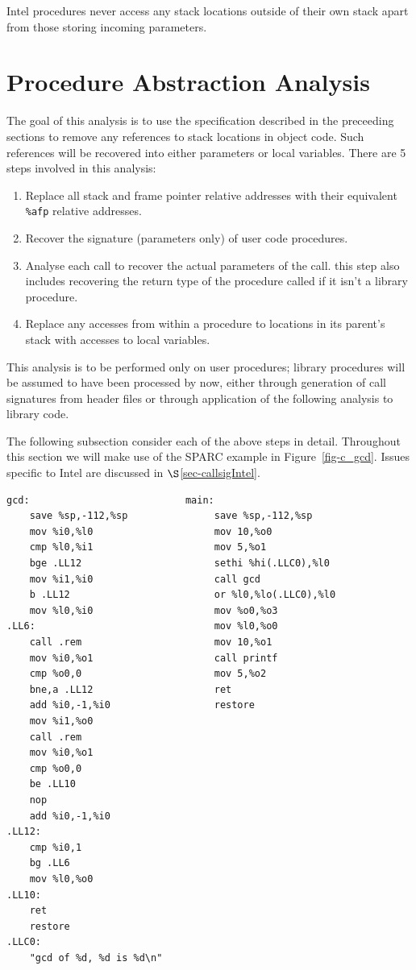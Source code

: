 Intel procedures never access any stack locations outside of their
own stack apart from those storing incoming parameters.

\section{Procedure Abstraction Analysis}

The goal of this analysis is to use the specification described in the
preceeding sections to remove any references to stack locations in
object code. Such references will be recovered into either parameters
or local variables. There are 5 steps involved in this analysis:

\begin{enumerate}
\item Replace all stack and frame pointer relative addresses with
  their equivalent {\tt \%afp} relative addresses.
\item Recover the signature (parameters only) of user code procedures.
\item Analyse each call to recover the actual parameters of the call.
  this step also includes recovering the return type of the procedure
  called if it isn't a library procedure.
\item Replace any accesses from within a procedure to locations in its
  parent's stack with accesses to local variables.
\end{enumerate}

This analysis is to be performed only on user procedures; library
procedures will be assumed to have been processed by now, either
through generation of call signatures from header files or through
application of the following analysis to library code.

The following subsection consider each of the above steps in
detail. Throughout this section we will make use of the SPARC
example in Figure~\ref{fig-c_gcd}.  Issues specific to Intel are
discussed in $\S$\ref{sec-callsigIntel}.

\centerfigbegin
{\small
\begin{verbatim}
gcd:                           main:
    save %sp,-112,%sp               save %sp,-112,%sp
    mov %i0,%l0                     mov 10,%o0
    cmp %l0,%i1                     mov 5,%o1
    bge .LL12                       sethi %hi(.LLC0),%l0
    mov %i1,%i0                     call gcd  
    b .LL12                         or %l0,%lo(.LLC0),%l0
    mov %l0,%i0                     mov %o0,%o3
.LL6:                               mov %l0,%o0
    call .rem                       mov 10,%o1
    mov %i0,%o1                     call printf  
    cmp %o0,0                       mov 5,%o2
    bne,a .LL12                     ret
    add %i0,-1,%i0                  restore
    mov %i1,%o0
    call .rem  
    mov %i0,%o1
    cmp %o0,0
    be .LL10
    nop
    add %i0,-1,%i0
.LL12:
    cmp %i0,1
    bg .LL6
    mov %l0,%o0
.LL10:
    ret
    restore
.LLC0:
    "gcd of %d, %d is %d\n"
\end{verbatim}
}


